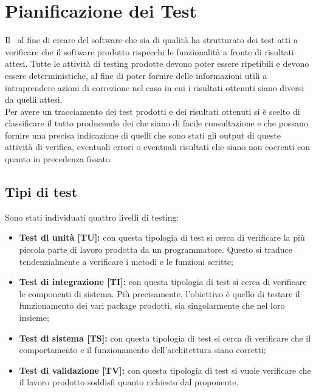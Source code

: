 \section{Pianificazione dei Test}
Il  \gruppo\ al fine di creare del software che sia di qualità ha strutturato dei test atti a verificare
che il software prodotto rispecchi le funzionalità a fronte di risultati attesi.
Tutte le attività di testing prodotte devono poter essere ripetibili e devono essere deterministiche, al fine di poter
fornire delle informazioni utili a intraprendere azioni di correzione nel caso in cui i risultati ottenuti siano diversi da quelli attesi. \\
Per avere un tracciamento dei test prodotti e dei risultati ottenuti si è scelto di classificare il tutto producendo dei
 che siano di facile consultazione e che possano fornire una precisa indicazione di quelli che sono stati
gli output di queste attività di verifica, eventuali errori o eventuali risultati che siano non coerenti con quanto in precedenza fissato.

\subsection{Tipi di test}
Sono stati individuati quattro livelli di testing:
\begin{itemize}
\item \textbf{Test di unità [TU]:} con questa tipologia di test si cerca di verificare la più piccola parte di lavoro prodotta da un programmatore. Questo si traduce tendenzialmente a verificare i metodi e le funzioni scritte;
\item \textbf{Test di integrazione [TI]:} con questa tipologia di test si cerca di verificare le componenti di sistema. Più precisamente, l'obiettivo è quello di testare il funzionamento dei vari package prodotti, sia singolarmente che nel loro insieme;
\item \textbf{Test di sistema [TS]:} con questa tipologia di test si cerca di verificare che il comportamento e il funzionamento dell'architettura siano corretti;
\item \textbf{Test di validazione [TV]:} con questa tipologia di test si vuole verificare che il lavoro prodotto soddisfi quanto richiesto dal proponente.
\end{itemize}





\newpage